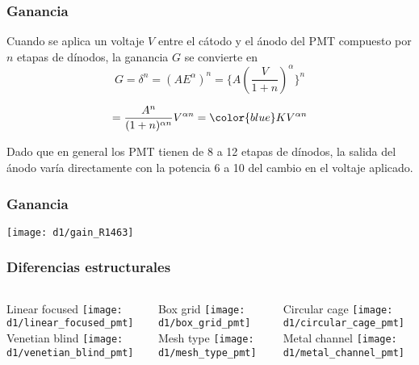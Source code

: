 \documentclass{beamer}
\begin{document}
\begin{frame}
\frametitle{Ganancia}
Cuando se aplica un voltaje $V$ entre el c\'atodo y el \'anodo del PMT compuesto por
$n$ etapas de d\'inodos, la ganancia $G$ se convierte en
$$G = \delta^n = \left(A E^\alpha \right)^n = \bigg\{A \left(\frac{V}{1 +
n}\right)^\alpha \bigg\}^n{}$$

$$ = \frac{A^n}{(1 + n)^{\alpha n}} V^{\alpha n} = {\color{blue}K V^{\alpha n}}$$

\begin{alertblock}{}
Dado que en general los PMT tienen de 8 a 12 etapas
de d\'inodos, la salida del \'anodo var\'ia directamente con la
potencia 6 a 10 del cambio en el voltaje aplicado.
\end{alertblock}
\end{frame} 

\begin{frame}
\frametitle{Ganancia}
\begin{center}
\texttt{[image: d1/gain\_R1463]}
\end{center}
\end{frame}

\begin{frame}
\frametitle{Diferencias estructurales}
\begin{columns}
\begin{column}{0.3\textwidth}
\begin{center}
{\color{blue}Linear focused}
\texttt{[image: d1/linear\_focused\_pmt]} \\
{\color{blue}Venetian blind}
\texttt{[image: d1/venetian\_blind\_pmt]}
\end{center}
\end{column}
\begin{column}{0.3\textwidth}
\begin{center}
{\color{blue}Box grid}
\texttt{[image: d1/box\_grid\_pmt]} \\
{\color{blue}Mesh type}
\texttt{[image: d1/mesh\_type\_pmt]}
\end{center}
\end{column}
\begin{column}{0.3\textwidth}
\begin{center}
{\color{blue}Circular cage}
\texttt{[image: d1/circular\_cage\_pmt]} \\ 
{\color{blue}Metal channel}
\texttt{[image: d1/metal\_channel\_pmt]}
\end{center}
\end{column}
\end{columns}
\end{frame}
\end{document}
